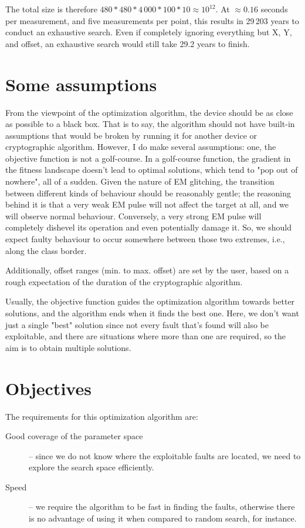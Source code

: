 \documentclass[times, utf8, diplomski]{fer}
\begin{document}
The total size is therefore $480*480*4\,000*100*10\approx 10^{12}$.
At $\approx0.16$ seconds per measurement, and five measurements per point, this
results in 29\,203 years to conduct an exhaustive search. Even if completely
ignoring everything but X, Y, and offset, an exhaustive search would still
take 29.2 years to finish.


\section{Some assumptions}\label{sec:assumptions}
From the viewpoint of the optimization algorithm, the device should be as close
as possible to a black box. That is to say, the algorithm should not have built-in
assumptions that would be broken by running it for another device or cryptographic
algorithm. However, I do make several assumptions:
one, the objective function is not a golf-course. In a golf-course function, the
gradient in the fitness landscape doesn't lead to optimal solutions, which tend
to "pop out of nowhere", all of a sudden. Given the nature of EM glitching, the
transition between different kinds of behaviour should be reasonably gentle; the
reasoning behind it is that a very weak EM pulse will not affect the target at all,
and we will observe normal behaviour. Conversely, a very strong EM pulse will
completely dishevel its operation and even potentially damage it. So, we should
expect faulty behaviour to occur somewhere between those two extremes, i.e.,
along the class border.

Additionally, offset ranges (min. to max. offset) are set by the user,
based on a rough expectation of the duration of the cryptographic algorithm.

Usually, the objective function guides the optimization algorithm towards better
solutions, and the algorithm ends when it finds the best one. Here, we don't want
just a single "best" solution since not every fault that's found will also be
exploitable, and there are situations where more than one are required, so the
aim is to obtain multiple solutions.


\section{Objectives}\label{sec:objectives}
The requirements for this optimization algorithm are:
\begin{description}
    \item[Good coverage of the parameter space] -- since we do not know where the
          exploitable faults are located, we need to explore the search space efficiently.
    \item[Speed] -- we require the algorithm to be fast in finding the faults, otherwise
          there is no advantage of using it when compared to random search, for instance.
\end{description}
\end{document}
